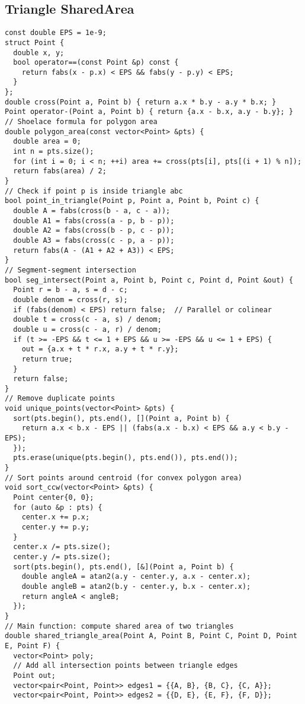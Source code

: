 \documentclass[twoside]{article}
\begin{document}
\begin{multicols*}{2}
{\subsection*{Triangle SharedArea}
}
\begin{verbatim}
const double EPS = 1e-9;
struct Point {
  double x, y;
  bool operator==(const Point &p) const {
    return fabs(x - p.x) < EPS && fabs(y - p.y) < EPS;
  }
};
double cross(Point a, Point b) { return a.x * b.y - a.y * b.x; }
Point operator-(Point a, Point b) { return {a.x - b.x, a.y - b.y}; }
// Shoelace formula for polygon area
double polygon_area(const vector<Point> &pts) {
  double area = 0;
  int n = pts.size();
  for (int i = 0; i < n; ++i) area += cross(pts[i], pts[(i + 1) % n]);
  return fabs(area) / 2;
}
// Check if point p is inside triangle abc
bool point_in_triangle(Point p, Point a, Point b, Point c) {
  double A = fabs(cross(b - a, c - a));
  double A1 = fabs(cross(a - p, b - p));
  double A2 = fabs(cross(b - p, c - p));
  double A3 = fabs(cross(c - p, a - p));
  return fabs(A - (A1 + A2 + A3)) < EPS;
}
// Segment-segment intersection
bool seg_intersect(Point a, Point b, Point c, Point d, Point &out) {
  Point r = b - a, s = d - c;
  double denom = cross(r, s);
  if (fabs(denom) < EPS) return false;  // Parallel or colinear
  double t = cross(c - a, s) / denom;
  double u = cross(c - a, r) / denom;
  if (t >= -EPS && t <= 1 + EPS && u >= -EPS && u <= 1 + EPS) {
    out = {a.x + t * r.x, a.y + t * r.y};
    return true;
  }
  return false;
}
// Remove duplicate points
void unique_points(vector<Point> &pts) {
  sort(pts.begin(), pts.end(), [](Point a, Point b) {
    return a.x < b.x - EPS || (fabs(a.x - b.x) < EPS && a.y < b.y - EPS);
  });
  pts.erase(unique(pts.begin(), pts.end()), pts.end());
}
// Sort points around centroid (for convex polygon area)
void sort_ccw(vector<Point> &pts) {
  Point center{0, 0};
  for (auto &p : pts) {
    center.x += p.x;
    center.y += p.y;
  }
  center.x /= pts.size();
  center.y /= pts.size();
  sort(pts.begin(), pts.end(), [&](Point a, Point b) {
    double angleA = atan2(a.y - center.y, a.x - center.x);
    double angleB = atan2(b.y - center.y, b.x - center.x);
    return angleA < angleB;
  });
}
// Main function: compute shared area of two triangles
double shared_triangle_area(Point A, Point B, Point C, Point D, Point E, Point F) {
  vector<Point> poly;
  // Add all intersection points between triangle edges
  Point out;
  vector<pair<Point, Point>> edges1 = {{A, B}, {B, C}, {C, A}};
  vector<pair<Point, Point>> edges2 = {{D, E}, {E, F}, {F, D}};

\end{verbatim}
\end{multicols*}
\end{document}
